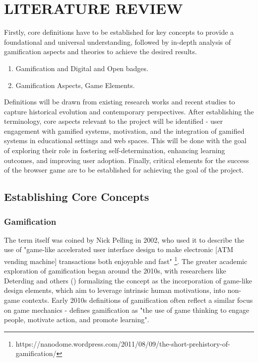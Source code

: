 \section{LITERATURE REVIEW}

Firstly, core definitions have to be established for key concepts to provide a foundational and universal understanding, followed by in-depth analysis of gamification  aspects and theories to achieve the desired results.

\begin{enumerate}
  \addtolength{\itemsep}{-0.5\baselineskip} 
  \item Gamification and Digital and Open badges.
  \item Gamification Aspects, Game Elements.
\end{enumerate}

Definitions will be drawn from existing research works and recent studies to capture historical evolution and contemporary perspectives. 
After establishing the terminology, core aspects relevant to the project will be identified - user engagement with gamified systems, motivation, and the integration of gamified systems in educational settings and web spaces. 
This will be done with the goal of exploring their role in fostering self-determination, enhancing learning outcomes, and improving user adoption. 
Finally, critical elements for the success of the browser game are to be established for achieving the goal of the project.

%
\subsection{Establishing Core Concepts}

\subsubsection{Gamification}
%
The term itself was coined by Nick Pelling in 2002, who used it to describe the use of "game-like accelerated user interface design to make electronic [ATM vending machine] transactions both enjoyable and fast" \footnote{https://nanodome.wordpress.com/2011/08/09/the-short-prehistory-of-gamification/}. 
The greater academic exploration of gamification began around the 2010s, with researchers like Deterding and others (\cite{definition}) formalizing the concept as the incorporation of game-like design elements, which aim to leverage intrinsic human motivations, into non-game contexts.
Early 2010s definitions of gamification often reflect a similar focus on game mechanics - \textcite{definition2} defines gamification as "the use of game thinking to engage people, motivate action, and promote learning".


